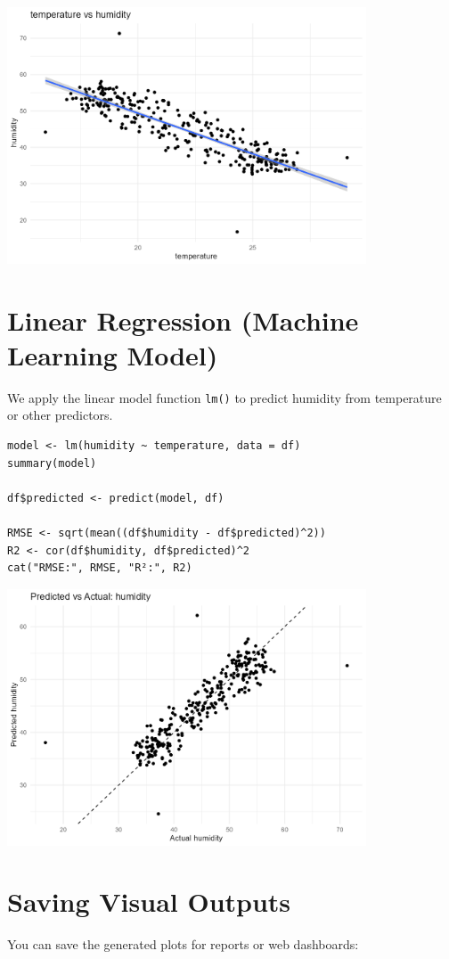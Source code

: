 \documentclass[12pt]{article}
\begin{document}
\includegraphics[width=0.8\textwidth]{figs/temperature_vs_humidity.png}

\section{Linear Regression (Machine Learning Model)}
We apply the linear model function \texttt{lm()} to predict humidity from temperature or other predictors.

\begin{lstlisting}
model <- lm(humidity ~ temperature, data = df)
summary(model)

df$predicted <- predict(model, df)

RMSE <- sqrt(mean((df$humidity - df$predicted)^2))
R2 <- cor(df$humidity, df$predicted)^2
cat("RMSE:", RMSE, "R²:", R2)
\end{lstlisting}

\includegraphics[width=0.8\textwidth]{figs/pred_vs_actual_humidity.png}

\section{Saving Visual Outputs}
You can save the generated plots for reports or web dashboards:
\end{document}
